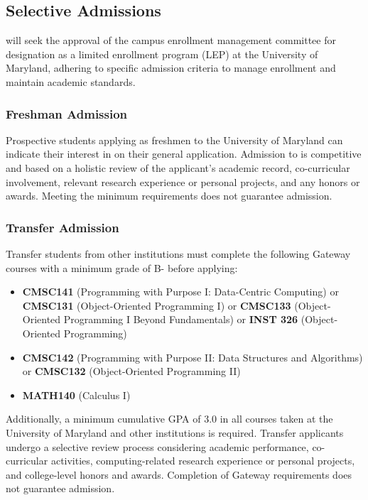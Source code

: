 \subsection{Selective Admissions}

\name{} will seek the approval of the campus enrollment management committee for designation as a limited enrollment program (LEP) at the University of Maryland, adhering to specific admission criteria to manage enrollment and maintain academic standards.

\subsubsection*{Freshman Admission}
Prospective students applying as freshmen to the University of Maryland can indicate their interest in \name{} on their general application. Admission to \short{} is competitive and based on a holistic review of the applicant's academic record, co-curricular involvement, relevant research experience or personal projects, and any honors or awards. Meeting the minimum requirements does not guarantee admission.

\subsubsection*{Transfer Admission}
Transfer students from other institutions must complete the following Gateway courses with a minimum grade of B- before applying:
\begin{itemize}
    \item \textbf{CMSC141} (Programming with Purpose I: Data-Centric Computing) or \textbf{CMSC131} (Object-Oriented Programming I) or \textbf{CMSC133} (Object-Oriented Programming I Beyond Fundamentals) or \textbf{INST 326} (Object-Oriented Programming)
    \item \textbf{CMSC142} (Programming with Purpose II: Data Structures and Algorithms) or \textbf{CMSC132} (Object-Oriented Programming II)
    \item \textbf{MATH140} (Calculus I) 
\end{itemize}

Additionally, a minimum cumulative GPA of 3.0 in all courses taken at the University of Maryland and other institutions is required. Transfer applicants undergo a selective review process considering academic performance, co-curricular activities, computing-related research experience or personal projects, and college-level honors and awards. Completion of Gateway requirements does not guarantee admission.

